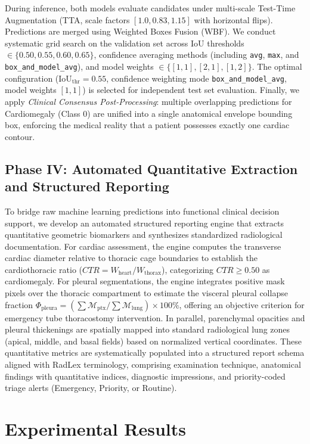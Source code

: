\documentclass[10pt,twocolumn,letterpaper]{article}
\begin{document}
During inference, both models evaluate candidates under multi-scale Test-Time Augmentation (TTA, scale factors $[1.0, 0.83, 1.15]$ with horizontal flips). Predictions are merged using Weighted Boxes Fusion (WBF). We conduct systematic grid search on the validation set across IoU thresholds $\in \{0.50, 0.55, 0.60, 0.65\}$, confidence averaging methods (including \texttt{avg}, \texttt{max}, and \texttt{box\_and\_\allowbreak model\_avg}), and model weights $\in \{[1, 1], [2, 1], [1, 2]\}$. The optimal configuration ($\text{IoU}_{\text{thr}}=0.55$, confidence weighting mode \texttt{box\_and\_\allowbreak model\_avg}, model weights $[1, 1]$) is selected for independent test set evaluation. Finally, we apply \textit{Clinical Consensus Post-Processing}: multiple overlapping predictions for Cardiomegaly (Class 0) are unified into a single anatomical envelope bounding box, enforcing the medical reality that a patient possesses exactly one cardiac contour.

\subsection{Phase IV: Automated Quantitative Extraction and Structured Reporting}
To bridge raw machine learning predictions into functional clinical decision support, we develop an automated structured reporting engine that extracts quantitative geometric biomarkers and synthesizes standardized radiological documentation. For cardiac assessment, the engine computes the transverse cardiac diameter relative to thoracic cage boundaries to establish the cardiothoracic ratio ($CTR = W_{\text{heart}} / W_{\text{thorax}}$), categorizing $CTR \ge 0.50$ as cardiomegaly. For pleural segmentations, the engine integrates positive mask pixels over the thoracic compartment to estimate the visceral pleural collapse fraction $\Phi_{\text{pleura}} = (\sum \mathcal{M}_{\text{ptx}} / \sum \mathcal{M}_{\text{lung}}) \times 100\%$, offering an objective criterion for emergency tube thoracostomy intervention. In parallel, parenchymal opacities and pleural thickenings are spatially mapped into standard radiological lung zones (apical, middle, and basal fields) based on normalized vertical coordinates. These quantitative metrics are systematically populated into a structured report schema aligned with RadLex terminology, comprising examination technique, anatomical findings with quantitative indices, diagnostic impressions, and priority-coded triage alerts (Emergency, Priority, or Routine).

\section{Experimental Results}
\end{document}
